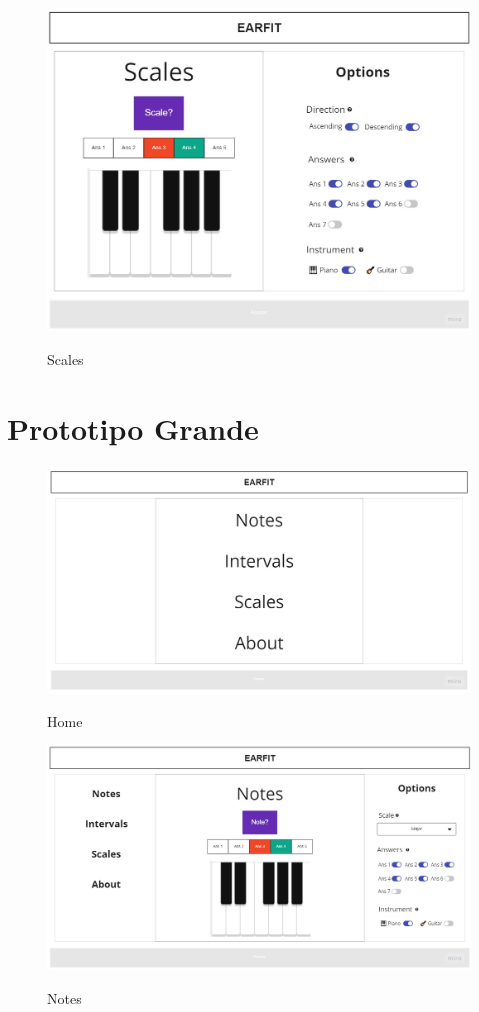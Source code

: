 \documentclass[12pt,twoside,titlepage]{report}
\begin{document}
\begin{figure}[H]
    \centering
    \includegraphics[scale=0.3]{Design Thinking/Prototipo/Medium/Scales}
    \label{fig:Scales}
    \caption{Scales}
\end{figure}

\section{Prototipo Grande}

\begin{figure}[H]
    \centering
    \includegraphics[scale=0.3]{Design Thinking/Prototipo/Large/Menu}
    \label{fig:MenuLarge}
    \caption{Home}
\end{figure}

\begin{figure}[H]
    \centering
    \includegraphics[scale=0.29]{Design Thinking/Prototipo/Large/Notes}
    \label{fig:NotesLarge}
    \caption{Notes}
\end{figure}
\end{document}

